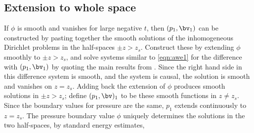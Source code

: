 \subsection{Extension to whole space}
If $\phi$ is smooth and vanishes for large negative $t$, then
$(p_1,\bv_1)$ can be constructed by pasting together the smooth
solutions of the inhomogeneous Dirichlet problems in the half-spaces
$\pm z > z_s$. Construct these by extending $\phi$ smoothly to
$\pm z>z_s$, and solve systems similar to \ref{eqn:awe1} for the
difference with $(p_1,\bv_1)$ by quoting the main results from
\cite{BlazekStolkSymes:13}. Since the right hand side in this
difference system is smooth, and the system is causal, the solution is
smooth and vanishes on $z=z_s$. Adding back the extension of $\phi$
produces smooth solutions in $\pm z > z_s$; define $(p_1,\bv)_1$ to be
these smooth functions in $z \ne z_s$. Since the boundary values for
pressure are the same, $p_1$ extends continuously to $z=z_s$. 
The pressure boundary value $\phi$ uniquely determines the solutions
in the two half-spaces, by standard energy estimates,

